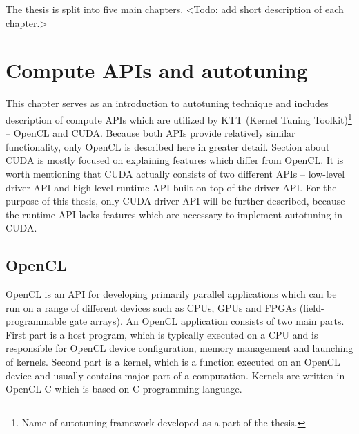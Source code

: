 \documentclass
[
    digital, %
    oneside, %
    table, %
    nolof, %
    nolot, %
    nocover %
]{fithesis3}
\begin{document}
The thesis is split into five main chapters. <Todo: add short description of each chapter.>

\chapter{Compute APIs and autotuning}
This chapter serves as an introduction to autotuning technique and includes description of compute APIs which are utilized by KTT (Kernel Tuning
Toolkit)\footnote{Name of autotuning framework developed as a part of the thesis.} -- OpenCL and CUDA. Because both APIs provide relatively similar
functionality, only OpenCL is described here in greater detail. Section about CUDA is mostly focused on explaining features which differ from OpenCL.
It is worth mentioning that CUDA actually consists of two different APIs -- low-level driver API and high-level runtime API built on top of the driver
API. For the purpose of this thesis, only CUDA driver API will be further described, because the runtime API lacks features which are necessary to
implement autotuning in CUDA.

\section{OpenCL}
OpenCL is an API for developing primarily parallel applications which can be run on a range of different devices such as CPUs, GPUs and FPGAs
(field-programmable gate arrays). An OpenCL application consists of two main parts. First part is a host program, which is typically executed on a CPU
and is responsible for OpenCL device configuration, memory management and launching of kernels. Second part is a kernel, which is a function executed
on an OpenCL device and usually contains major part of a computation. Kernels are written in OpenCL C which is based on C programming language.
\end{document}
